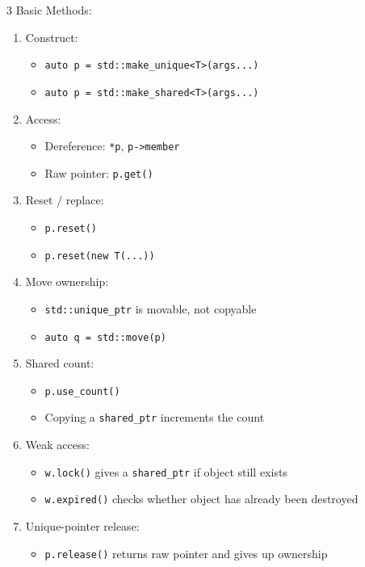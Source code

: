\documentclass[12pt, a4paper]{article}
\begin{document}
\begin{multicols*}{3}
Basic Methods:
\begin{enumerate}[\roman*.]
  \item Construct:
    \begin{itemize}[leftmargin=*]\vspace{3pt}
      \item \lstinline|auto p = std::make_unique<T>(args...)|
      \item \lstinline|auto p = std::make_shared<T>(args...)|
    \end{itemize}
  \item Access:
    \begin{itemize}[leftmargin=*]\vspace{3pt}
      \item Dereference: \lstinline|*p|, \lstinline|p->member|
      \item Raw pointer: \lstinline|p.get()|
    \end{itemize}
  \item Reset / replace:
    \begin{itemize}[leftmargin=*]\vspace{3pt}
      \item \lstinline|p.reset()|
      \item \lstinline|p.reset(new T(...))|
    \end{itemize}
  \item Move ownership:
    \begin{itemize}[leftmargin=*]\vspace{3pt}
      \item \lstinline|std::unique_ptr| is movable, not copyable
      \item \lstinline|auto q = std::move(p)|
    \end{itemize}
  \item Shared count:
    \begin{itemize}[leftmargin=*]\vspace{3pt}
      \item \lstinline|p.use_count()|
      \item Copying a \lstinline|shared_ptr| increments the count
    \end{itemize}
  \item Weak access:
    \begin{itemize}[leftmargin=*]\vspace{3pt}
      \item \lstinline|w.lock()| gives a \lstinline|shared_ptr| if object still exists
      \item \lstinline|w.expired()| checks whether object has already been destroyed
    \end{itemize}
  \item Unique-pointer release:
    \begin{itemize}[leftmargin=*]\vspace{3pt}
      \item \lstinline|p.release()| returns raw pointer and gives up ownership
    \end{itemize}
\end{enumerate}
\colbreak 

\end{multicols*}
\end{document}

